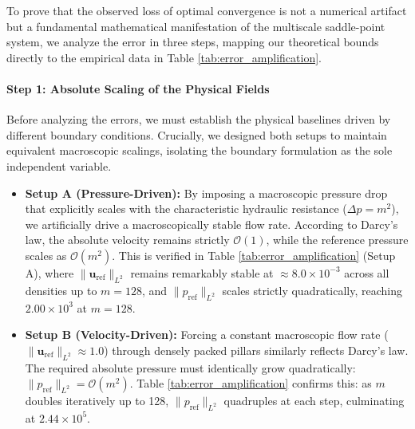 \documentclass{elsarticle}
\begin{document}
To prove that the observed loss of optimal convergence is not a numerical artifact but a fundamental mathematical manifestation of the multiscale saddle-point system, we analyze the error in three steps, mapping our theoretical bounds directly to the empirical data in Table \ref{tab:error_amplification}.

\paragraph{Step 1: Absolute Scaling of the Physical Fields}
Before analyzing the errors, we must establish the physical baselines driven by different boundary conditions. Crucially, we designed both setups to maintain equivalent macroscopic scalings, isolating the boundary formulation as the sole independent variable.
\begin{itemize}
    \item \textbf{Setup A (Pressure-Driven):} By imposing a macroscopic pressure drop that explicitly scales with the characteristic hydraulic resistance ($\Delta p = m^2$), we artificially drive a macroscopically stable flow rate. According to Darcy's law, the absolute velocity remains strictly $\mathcal{O}(1)$, while the reference pressure scales as $\mathcal{O}(m^2)$. This is verified in Table \ref{tab:error_amplification} (Setup A), where $\|\mathbf{u}_{\mathrm{ref}}\|_{L^2}$ remains remarkably stable at $\approx 8.0 \times 10^{-3}$ across all densities up to $m=128$, and $\|p_{\mathrm{ref}}\|_{L^2}$ scales strictly quadratically, reaching $2.00 \times 10^3$ at $m=128$.
    \item \textbf{Setup B (Velocity-Driven):} Forcing a constant macroscopic flow rate ($\|\mathbf{u}_{\mathrm{ref}}\|_{L^2} \approx 1.0$) through densely packed pillars similarly reflects Darcy's law. The required absolute pressure must identically grow quadratically: $\|p_{\mathrm{ref}}\|_{L^2} = \mathcal{O}(m^2)$. Table \ref{tab:error_amplification} confirms this: as $m$ doubles iteratively up to 128, $\|p_{\mathrm{ref}}\|_{L^2}$ quadruples at each step, culminating at $2.44 \times 10^5$.
\end{itemize}
\end{document}
